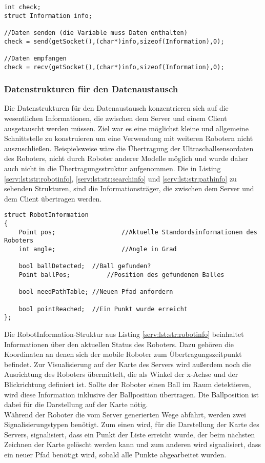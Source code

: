 \begin{lstlisting}[frame=tb,captionpos=b,caption=Senden und Empfangen., label=serv:lst:sendenempfangen]
int check;
struct Information info;

//Daten senden (die Variable muss Daten enthalten)
check = send(getSocket(),(char*)info,sizeof(Information),0);

//Daten empfangen
check = recv(getSocket(),(char*)info,sizeof(Information),0);
\end{lstlisting}

\subsubsection{Datenstrukturen für den Datenaustausch}\label{serv:datenstrukturen}

Die Datenstrukturen für den Datenaustausch konzentrieren sich auf die wesentlichen Informationen, die zwischen dem Server und einem Client ausgetauscht werden müssen. Ziel war es eine möglichst kleine und allgemeine Schnittstelle zu konstruieren um eine Verwendung mit weiteren Robotern nicht auszuschließen. Beispielsweise wäre die Übertragung der Ultraschallsensordaten des Roboters, nicht durch Roboter anderer Modelle möglich und wurde daher auch nicht in die Übertragungsstruktur aufgenommen. Die in Listing \ref{serv:lst:str:robotinfo}, \ref{serv:lst:str:searchinfo} und \ref{serv:lst:str:pathinfo}  zu sehenden Strukturen, sind die Informationsträger, die zwischen dem Server und dem Client übertragen werden.

\begin{lstlisting}[frame=tb,captionpos=b,caption=Datenstruktur RobotInformation., label=serv:lst:str:robotinfo]
struct RobotInformation
{			
	Point pos;					//Aktuelle Standordsinformationen des Roboters
	int angle;					//Angle in Grad

	bool ballDetected;	//Ball gefunden?
	Point ballPos;			//Position des gefundenen Balles

	bool needPathTable; //Neuen Pfad anfordern

	bool pointReached; 	//Ein Punkt wurde erreicht
};
\end{lstlisting}

Die RobotInformation-Struktur aus Listing \ref{serv:lst:str:robotinfo} beinhaltet Informationen über den aktuellen Status des Roboters. Dazu gehören die Koordinaten an denen sich der mobile Roboter zum Übertragungszeitpunkt befindet. Zur Visualisierung auf der Karte des Servers wird außerdem noch die Ausrichtung des Roboters übermittelt, die als Winkel der x-Achse und der Blickrichtung definiert ist. Sollte der Roboter einen Ball im Raum detektieren, wird diese Information inklusive der Ballposition übertragen. Die Ballposition ist dabei für die Darstellung auf der Karte nötig.\\ Während der Roboter die vom Server generierten Wege abfährt, werden zwei Signalisierungstypen benötigt. Zum einen wird, für die Darstellung der Karte des Servers, signalisiert, dass ein Punkt der Liste erreicht wurde, der beim nächsten Zeichnen der Karte gelöscht werden kann und zum anderen wird signalisiert, dass ein neuer Pfad benötigt wird, sobald alle Punkte abgearbeitet wurden. 

